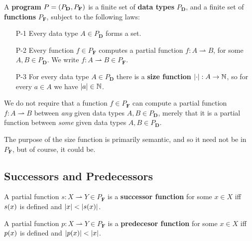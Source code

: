 \begin{specification}

A \textbf{program} $P = {\mathopen{}\left({P_\mathbf{D}, P_\mathbf{F}}\right)\mathclose{}}$ is a finite set of
\textbf{data types} $P_\mathbf{D}$, and a finite set of \textbf{functions}
$P_\mathbf{F}$, subject to the following laws:

\begin{enumerate}

\item [P-1] Every data type $A \in P_\mathbf{D}$ forms a set.

\item [P-2] Every function $f \in P_\mathbf{F}$ computes a partial function $f
: A \rightharpoonup B$, for some $A, B\in P_\mathbf{D}$. We write $f : A
\rightharpoonup B \in P_\mathbf{F}$.

\item [P-3] For every data type $A \in P_\mathbf{D}$ there is a \textbf{size
function} ${\mathopen{}\left|{\cdot}\right|\mathclose{}} : A \rightarrow \mathbb{N}$, so for every $a \in A$ we
have ${\mathopen{}\left|{a}\right|\mathclose{}} \in \mathbb{N}$.

\end{enumerate}

\end{specification}

\begin{remark} We do not require that a function $f \in P_\mathbf{F}$ can
compute a partial function $f : A \rightharpoonup B$ between \emph{any} given
data types $A, B \in P_\mathbf{D}$, merely that it is a partial function
between \emph{some} given data types $A, B \in P_\mathbf{D}$.  \end{remark}

\begin{remark} The purpose of the size function is primarily semantic, and so
it need not be in $P_\mathbf{F}$, but of course, it could be. \end{remark}

\subsection{Successors and Predecessors}

\begin{definition} A partial function $s : X \rightharpoonup Y \in
P_\mathbf{F}$ is a \textbf{successor function} for some $x \in X$ iff $s{\mathopen{}\left({x}\right)\mathclose{}}$
is defined and ${\mathopen{}\left|{x}\right|\mathclose{}} < {\mathopen{}\left|{s{\mathopen{}\left({x}\right)\mathclose{}}}\right|\mathclose{}}$. \end{definition}

\begin{definition} A partial function $p : X \rightharpoonup Y \in
P_\mathbf{F}$ is a \textbf{predecesor function} for some $x \in X$ iff $p{\mathopen{}\left({x}\right)\mathclose{}}$
is defined and ${\mathopen{}\left|{p{\mathopen{}\left({x}\right)\mathclose{}}}\right|\mathclose{}} < {\mathopen{}\left|{x}\right|\mathclose{}}$. \end{definition}

